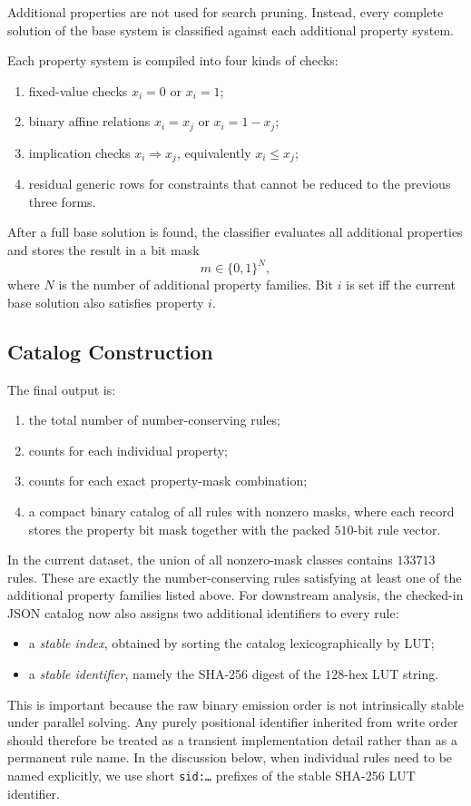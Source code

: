 \documentclass[11pt,a4paper]{article}
\newcommand{\sid}[1]{\texttt{sid:}\allowbreak\texttt{#1}}
\begin{document}
Additional properties are not used for search pruning.  Instead, every complete solution of the
base system is classified against each additional property system.

Each property system is compiled into four kinds of checks:
\begin{enumerate}
\item fixed-value checks \(x_i=0\) or \(x_i=1\);
\item binary affine relations \(x_i=x_j\) or \(x_i=1-x_j\);
\item implication checks \(x_i \Rightarrow x_j\), equivalently \(x_i \le x_j\);
\item residual generic rows for constraints that cannot be reduced to the previous three forms.
\end{enumerate}

After a full base solution is found, the classifier evaluates all additional properties and
stores the result in a bit mask
\[
m \in \{0,1\}^{N},
\]
where \(N\) is the number of additional property families.  Bit \(i\) is set iff the current
base solution also satisfies property \(i\).

\subsection{Catalog Construction}

The final output is:
\begin{enumerate}
\item the total number of number-conserving rules;
\item counts for each individual property;
\item counts for each exact property-mask combination;
\item a compact binary catalog of all rules with nonzero masks, where each record stores
      the property bit mask together with the packed \(510\)-bit rule vector.
\end{enumerate}

In the current dataset, the union of all nonzero-mask classes contains \(133713\) rules.  These
are exactly the number-conserving rules satisfying at least one of the additional property
families listed above.  For downstream analysis, the checked-in JSON catalog now also assigns
two additional identifiers to every rule:
\begin{itemize}
\item a \emph{stable index}, obtained by sorting the catalog lexicographically by LUT;
\item a \emph{stable identifier}, namely the SHA-256 digest of the \(128\)-hex LUT string.
\end{itemize}
This is important because the raw binary emission order is not intrinsically stable under
parallel solving.  Any purely positional identifier inherited from write order should therefore
be treated as a transient implementation detail rather than as a permanent rule name.  In the
discussion below, when individual rules need to be named explicitly, we use short
\sid{\dots} prefixes of the stable SHA-256 LUT identifier.
\end{document}
